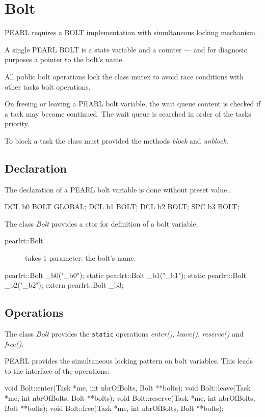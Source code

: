 \chapter{Bolt}
PEARL requires a BOLT implementation with simultaneous locking
mechanism.

A single PEARL BOLT is
a state variable and a counter --- 
and for diagnosic purposes a pointer to the bolt's name.

All public bolt operations lock the class mutex to avoid race conditions 
with other tasks bolt operations.

On freeing or leaving a PEARL bolt variable,
 the wait queue content is checked if a 
task may become continued. The wait queue is searched in order of the tasks 
priority. 

To block a task the class must provided the methods {\em block} and 
{\em unblock}.

\section{Declaration}
The declaration of a PEARL bolt variable is done without preset value..

\begin{PEARLCode}
DCL b0 BOLT GLOBAL;
DCL b1 BOLT;
DCL b2 BOLT;
SPC b3 BOLT;
\end{PEARLCode}

The class {\em Bolt} provides  a ctor for definition 
of a bolt variable.
\begin{description}
\item[pearlrt::Bolt] takes 1 parameter: the bolt's name.
\end{description}

\begin{CppCode}
pearlrt::Bolt _b0("_b0");
static pearlrt::Bolt _b1("_b1");
static pearlrt::Bolt _b2("_b2");
extern pearlrt::Bolt _b3;
\end{CppCode}

\section{Operations}
The class {\em Bolt} provides the \verb|static| operations 
{\em enter()}, {\em leave()}, {\em reserve()} and  {\em free()}.

PEARL provides the simultaneous locking pattern on bolt variables.
This leads to the interface of the operations:
\begin{CppCode}
void Bolt::enter(Task *me, int nbrOfBolts, Bolt **bolts);
void Bolt::leave(Task *me, int nbrOfBolts, Bolt **bolts);
void Bolt::reserve(Task *me, int nbrOfBolts, Bolt **bolts);
void Bolt::free(Task *me, int nbrOfBolts, Bolt **bolts);
\end{CppCode}

